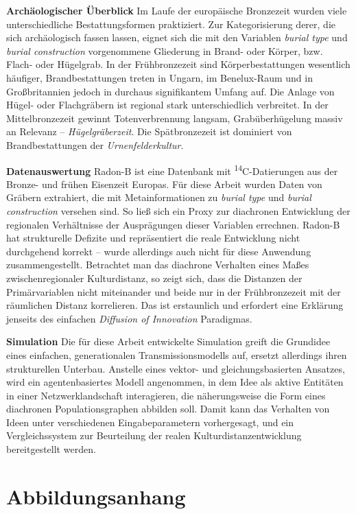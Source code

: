 \documentclass[openany,twoside,twocolumn]{book}
\renewcommand{\printbibliography}{}
\begin{document}
\textbf{Archäologischer Überblick} \newline  Im Laufe der europäische
Bronzezeit wurden viele unterschiedliche Bestattungsformen praktiziert.
Zur Kategorisierung derer, die sich archäologisch fassen lassen, eignet
sich die mit den Variablen \emph{burial type} und \emph{burial
construction} vorgenommene Gliederung in Brand- oder Körper, bzw. Flach-
oder Hügelgrab. In der Frühbronzezeit sind Körperbestattungen wesentlich
häufiger, Brandbestattungen treten in Ungarn, im Benelux-Raum und in
Großbritannien jedoch in durchaus signifikantem Umfang auf. Die Anlage
von Hügel- oder Flachgräbern ist regional stark unterschiedlich
verbreitet. In der Mittelbronzezeit gewinnt Totenverbrennung langsam,
Grabüberhügelung massiv an Relevanz -- \emph{Hügelgräberzeit}. Die
Spätbronzezeit ist dominiert von Brandbestattungen der
\emph{Urnenfelderkultur}.

\textbf{Datenauswertung} \newline  Radon-B ist eine Datenbank mit
\textsuperscript{14}C-Datierungen aus der Bronze- und frühen Eisenzeit
Europas. Für diese Arbeit wurden Daten von Gräbern extrahiert, die mit
Metainformationen zu \emph{burial type} und \emph{burial construction}
versehen sind. So ließ sich ein Proxy zur diachronen Entwicklung der
regionalen Verhältnisse der Ausprägungen dieser Variablen errechnen.
Radon-B hat strukturelle Defizite und repräsentiert die reale
Entwicklung nicht durchgehend korrekt -- wurde allerdings auch nicht für
diese Anwendung zusammengestellt. Betrachtet man das diachrone Verhalten
eines Maßes zwischenregionaler Kulturdistanz, so zeigt sich, dass die
Distanzen der Primärvariablen nicht miteinander und beide nur in der
Frühbronzezeit mit der räumlichen Distanz korrelieren. Das ist
erstaunlich und erfordert eine Erklärung jenseits des einfachen
\emph{Diffusion of Innovation} Paradigmas.

\textbf{Simulation} \newline  Die für diese Arbeit entwickelte
Simulation greift die Grundidee eines einfachen, generationalen
Transmissionsmodells auf, ersetzt allerdings ihren strukturellen
Unterbau. Anstelle eines vektor- und gleichungsbasierten Ansatzes, wird
ein agentenbasiertes Modell angenommen, in dem Idee als aktive Entitäten
in einer Netzwerklandschaft interagieren, die näherungsweise die Form
eines diachronen Populationsgraphen abbilden soll. Damit kann das
Verhalten von Ideen unter verschiedenen Eingabeparametern vorhergesagt,
und ein Vergleichssystem zur Beurteilung der realen
Kulturdistanzentwicklung bereitgestellt werden.

\hypertarget{abbildungsanhang}{%
\chapter{Abbildungsanhang}\label{abbildungsanhang}}

\begingroup
\let\clearpage\relax
\listoffigures
\endgroup

\printbibliography
\end{document}

